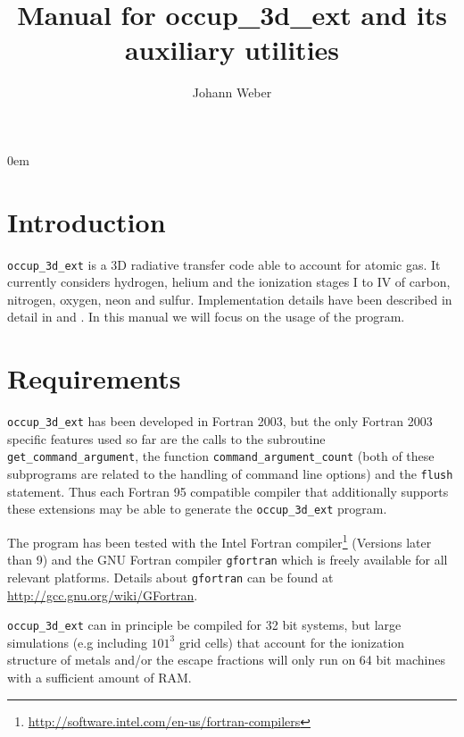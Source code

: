 \documentclass[a4paper,10pt]{article}
\title{Manual for occup\_3d\_ext and its auxiliary utilities}
\author{Johann Weber}
\begin{document}
\parindent 0em

\maketitle


\tableofcontents

\section{Introduction}
\label{sec:intro}
\texttt{occup\_3d\_ext} is a 3D radiative transfer code able to account for 
atomic gas. It currently considers hydrogen, helium and the ionization stages  
I to IV of carbon, nitrogen, oxygen, neon and sulfur. Implementation details 
have been described in detail in \cite{Weber2013} and \cite{Weber2015}. 
In this manual we will focus on the usage of the program. 

\section{Requirements}
\texttt{occup\_3d\_ext} has been developed in Fortran 2003, but the only 
Fortran 2003 specific features used so far are the  calls to  the subroutine 
\texttt{get\_command\_argument}, the function \texttt{command\_argument\_count} 
(both of these subprograms are related to the handling of command line options) 
and the \texttt{flush} statement. Thus each Fortran 95 compatible compiler 
that additionally  supports these extensions may be able to generate the 
\texttt{occup\_3d\_ext} program.

The program has been tested with the Intel Fortran  
compiler\footnote{\url{http://software.intel.com/en-us/fortran-compilers}} 
(Versions later than 9) and the GNU Fortran compiler \texttt{gfortran} which is
freely available for all relevant platforms. 
Details about \texttt{gfortran} can be found at\\
\url{http://gcc.gnu.org/wiki/GFortran}.

\texttt{occup\_3d\_ext}  can in principle be compiled for 32 bit systems, but 
large simulations (e.g including $101^3$ grid cells) that account for the 
ionization structure of metals and/or the escape fractions will only run on 64 
bit machines with a sufficient amount of RAM.
\end{document}
